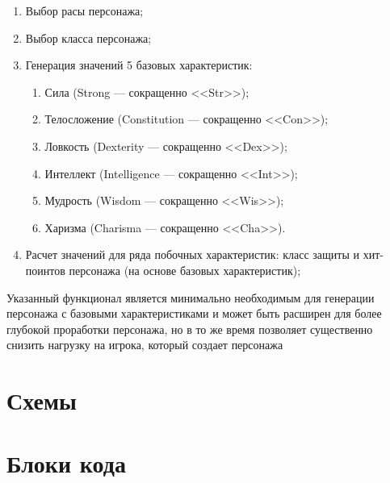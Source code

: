\documentclass[12pt,a4paper]{article}
\begin{document}
\begin{enumerate}
    \item Выбор расы персонажа;

    \item Выбор класса персонажа;

    \item Генерация значений 5 базовых характеристик:

    \begin{enumerate}
        \item Сила (Strong --- сокращенно <<Str>>);
        
        \item Телосложение (Constitution --- сокращенно <<Con>>);
        
        \item Ловкость (Dexterity --- сокращенно <<Dex>>);
        
        \item Интеллект (Intelligence --- сокращенно <<Int>>);
        
        \item Мудрость (Wisdom --- сокращенно <<Wis>>);
        
        \item Харизма (Charisma --- сокращенно <<Cha>>).
    \end{enumerate}

    \item Расчет значений для ряда побочных характеристик: класс защиты и хит-поинтов персонажа (на основе базовых характеристик);


\end{enumerate}

Указанный функционал является минимально необходимым для генерации персонажа с базовыми характеристиками и может быть расширен для более глубокой проработки персонажа, но в то же время позволяет существенно снизить нагрузку на игрока, который создает персонажа

\section{Схемы}



\section{Блоки кода}
\end{document}
